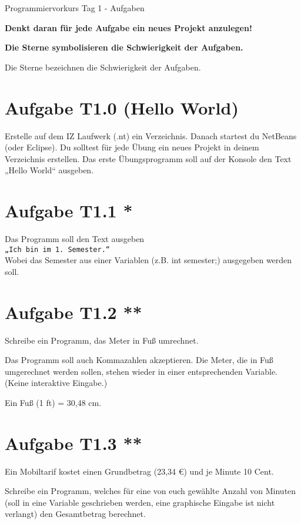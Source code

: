 \documentclass[final,a4paper]{article}
\begin{document}



{\huge Programmiervorkurs Tag 1 - Aufgaben}

\bigskip

\textbf{\color{red}Denkt daran für jede Aufgabe ein neues Projekt anzulegen!}

\textbf{\color{orange}Die Sterne symbolisieren die Schwierigkeit der Aufgaben.}

Die Sterne bezeichnen die Schwierigkeit der Aufgaben.

\section*{Aufgabe T1.0 (Hello World)}
Erstelle auf dem IZ Laufwerk (.nt) ein Verzeichnis.
Danach startest du NetBeans (oder Eclipse).
Du solltest für jede Übung ein neues Projekt in deinem Verzeichnis erstellen.
Das erste Übungsprogramm soll auf der Konsole den Text „Hello World“ ausgeben.

\section*{Aufgabe T1.1 *}
Das Programm soll den Text ausgeben\\
\texttt{„Ich bin im 1. Semester.“}\\
Wobei das Semester aus einer Variablen (z.B. int semester;) ausgegeben werden soll.

\section*{Aufgabe T1.2 **}
Schreibe ein Programm, das Meter in Fuß umrechnet. 

Das Programm soll auch Kommazahlen akzeptieren. 
Die Meter, die in Fuß umgerechnet werden sollen, stehen wieder in einer entsprechenden Variable. 
(Keine interaktive Eingabe.)

Ein Fuß (1 ft) = 30,48 cm.

\section*{Aufgabe T1.3 **}
Ein Mobiltarif kostet einen Grundbetrag (23,34 \euro) und je Minute 10 Cent. 

Schreibe ein Programm, welches für eine von euch gewählte Anzahl von Minuten (soll in eine Variable geschrieben werden, eine graphische Eingabe ist nicht verlangt) den Gesamtbetrag berechnet.
\end{document}
